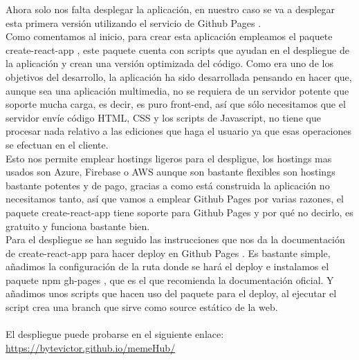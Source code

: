 Ahora solo nos falta desplegar la aplicación, en nuestro caso se va a desplegar esta primera 
versión utilizando el servicio de Github Pages \cite{GithubPages}.
\\
Como comentamos al inicio, para crear esta aplicación empleamos el paquete create-react-app \cite{create-react-app},
este paquete cuenta con scripts que ayudan en el despliegue de la aplicación y crean una 
versión optimizada del código.
Como era uno de los objetivos del desarrollo, la aplicación ha sido desarrollada pensando
en hacer que, aunque sea una aplicación multimedia, no se requiera de un servidor potente que
soporte mucha carga, es decir, es puro front-end, así que sólo necesitamos que el servidor
envíe código HTML, CSS y los scripts de Javascript, no tiene que procesar nada relativo a las
ediciones que haga el usuario ya que esas operaciones se efectuan en el cliente.
\\
Esto nos permite emplear hostings ligeros para el despligue, 
los hostings mas usados son Azure, Firebase o AWS aunque son bastante flexibles son hostings 
bastante potentes y de pago, gracias a como está construida la aplicación no necesitamos tanto,
así que vamos a emplear Github Pages por varias razones, el paquete 
create-react-app \cite{create-react-app} tiene soporte para Github Pages \cite{GithubPages}
y por qué no decirlo, es gratuito y funciona bastante bien.
\\
Para el despliegue se han seguido las instrucciones que nos da la documentación de 
create-react-app para hacer deploy en Github Pages \cite{GithubPagesDeploy}.
Es bastante simple, añadimos la configuración de la ruta donde se hará el deploy e instalamos
el paquete npm gh-pages \cite{gh-pages}, que es el que recomienda la documentación oficial.
Y añadimos unos scripts que hacen uso del paquete para el deploy, al ejecutar el script
crea una branch que sirve como source estático de la web.
\\\\
El despliegue puede probarse en el siguiente enlace: \url{https://bytevictor.github.io/memeHub/}